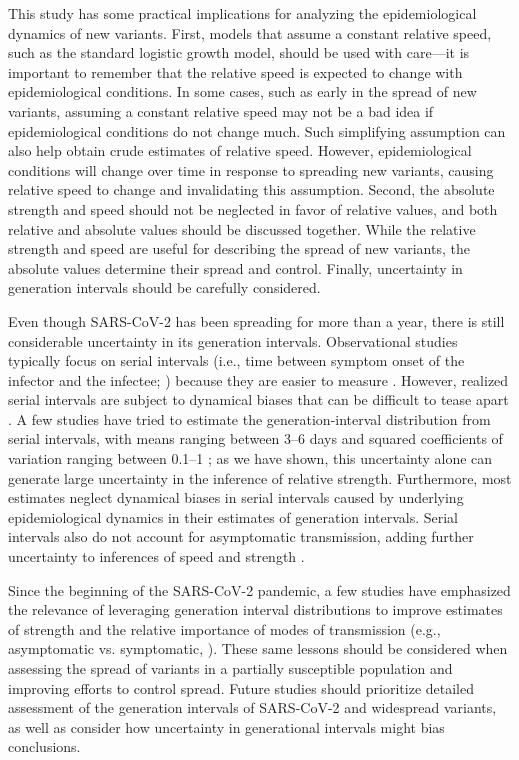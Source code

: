\documentclass[12pt]{article}
\begin{document}
This study has some practical implications for analyzing the epidemiological dynamics of new variants.
First, models that assume a constant relative speed, such as the standard logistic growth model, should be used with care---it is important to remember that the relative speed is expected to change with epidemiological conditions.
In some cases, such as early in the spread of new variants, assuming a constant relative speed may not be a bad idea if epidemiological conditions do not change much. Such simplifying assumption can also help obtain crude estimates of relative speed. However, epidemiological conditions will change over time in response to spreading new variants, causing relative speed to change and invalidating this assumption.
Second, the absolute strength and speed should not be neglected in favor of relative values, and both relative and absolute values should be discussed together.
While the relative strength and speed are useful for describing the spread of new variants, the absolute values determine their spread and control.
Finally, uncertainty in generation intervals should be carefully considered.

Even though SARS-CoV-2 has been spreading for more than a year, there is still considerable uncertainty in its generation intervals.
Observational studies typically focus on serial intervals (i.e., time between symptom onset of the infector and the infectee; \cite{svensson2007note}) because they are easier to measure \citep{griffin2020rapid}.
However, realized serial intervals are subject to dynamical biases that can be difficult to tease apart \citep{park2021forward}.
A few studies have tried to estimate the generation-interval distribution from serial intervals, with means ranging between 3--6 days and squared coefficients of variation ranging between 0.1--1 \citep{ferretti2020quantifying,Ferretti2020timing,ganyani2020estimating,knight2020estimating}; 
as we have shown, this uncertainty alone can generate large uncertainty in the inference of relative strength.
Furthermore, most estimates neglect dynamical biases in serial intervals caused by underlying epidemiological dynamics in their estimates of generation intervals.
Serial intervals also do not account for asymptomatic transmission, adding further uncertainty to inferences of speed and strength \citep{park2020time}.

Since the beginning of the SARS-CoV-2 pandemic, a few studies have emphasized the relevance of leveraging generation interval distributions to improve estimates of strength \citep{doi:10.1098/rsif.2020.0144,ali2020serial,gostic2020practical,park2021forward} and the relative importance of modes of transmission (e.g., asymptomatic vs. symptomatic, \cite{park2020time}).
These same lessons should be considered when assessing the spread of variants in a partially susceptible population and improving efforts to control spread.
Future studies should prioritize detailed assessment of the generation intervals of SARS-CoV-2 and widespread variants, as well as consider how uncertainty in generational intervals might bias conclusions.
\end{document}
